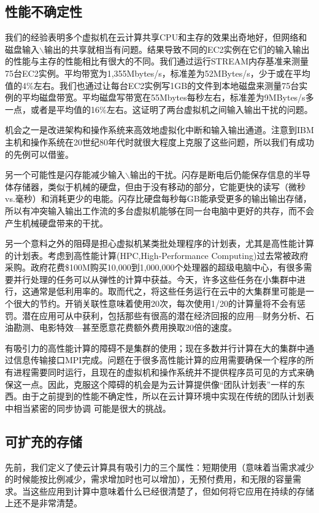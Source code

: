 \subsection{性能不确定性}

我们的经验表明多个虚拟机在云计算共享CPU和主存的效果出奇地好，但网络和磁盘输入$\backslash$输出的共享就相当有问题。结果导致不同的EC2实例在它们的输入输出的性能与主存的性能相比有很大的不同。我们通过运行STREAM内存基准来测量75台EC2实例。平均带宽为1,355Mbytes/s，标准差为52MBytes/s，少于或在平均值的4\%左右。我们也通过让每台EC2实例写1GB的文件到本地磁盘来测量75台实例的平均磁盘带宽。平均磁盘写带宽在55Mbytes每秒左右，标准差为9MBytes/s多一点，或者是平均值的16\%左右。这证明了两台虚拟机之间输入输出干扰的问题。

机会之一是改进架构和操作系统来高效地虚拟化中断和输入输出通道。注意到IBM主机和操作系统在20世纪80年代时就很大程度上克服了这些问题，所以我们有成功的先例可以借鉴。

另一个可能性是闪存能减少输入$\backslash$输出的干扰。闪存是断电后仍能保存信息的半导体存储器，类似于机械的硬盘，但由于没有移动的部分，它能更快的读写（微秒vs.毫秒）和消耗更少的电能。闪存比硬盘每秒每GB能承受更多的输出输出存储，所以有冲突输入输出工作流的多台虚拟机能够在同一台电脑中更好的共存，而不会产生机械硬盘带来的干扰。

另一个意料之外的阻碍是担心虚拟机某类批处理程序的计划表，尤其是高性能计算的计划表。考虑到高性能计算(HPC,High-Performance Computing)过去常被政府采购。政府花费\$100M购买10,000到1,000,000个处理器的超级电脑中心，有很多需要并行处理的任务可以从弹性的计算中获益。今天，许多这些任务在小集群中进行，这通常是低利用率的。取而代之，将这些任务运行在云中的大集群里可能是一个很大的节约。开销关联性意味着使用20次，每次使用1/20的计算量将不会有惩罚。潜在应用可从中获利，包括那些有很高的潜在经济回报的应用—财务分析、石油勘测、电影特效—甚至愿意花费额外费用换取20倍的速度。

有吸引力的高性能计算的障碍不是集群的使用；现在多数并行计算在大的集群中通过信息传输接口MPI完成。问题在于很多高性能计算的应用需要确保一个程序的所有进程需要同时运行，且现在的虚拟机和操作系统并不提供程序员可见的方式来确保这一点。因此，克服这个障碍的机会是为云计算提供像“团队计划表”一样的东西。由于之前提到的性能不确定性，所以在云计算环境中实现在传统的团队计划表中相当紧密的同步协调 可能是很大的挑战。

\subsection{可扩充的存储}

先前，我们定义了使云计算具有吸引力的三个属性：短期使用（意味着当需求减少的时候能按比例减少，需求增加时也可以增加），无预付费用，和无限的容量需求。当这些应用到计算中意味着什么已经很清楚了，但如何将它应用在持续的存储上还不是非常清楚。

